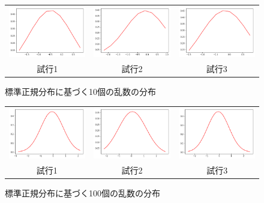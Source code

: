 \begin{figure}[h]
  \begin{center}
    \begin{tabular}{ccc}
      \includegraphics[width=0.32\hsize]{figure/10__1.png} &
      \includegraphics[width=0.32\hsize]{figure/10__2.png} &
      \includegraphics[width=0.32\hsize]{figure/10__3.png} \\
      試行1 & 試行2 &試行3
    \end{tabular}
    \caption{標準正規分布に基づく10個の乱数の分布}
    \label{figure1}
  \end{center}
\end{figure}
\begin{figure}[h]
  \begin{center}
    \begin{tabular}{ccc}
      \includegraphics[width=0.32\hsize]{figure/100__1.png} &
      \includegraphics[width=0.32\hsize]{figure/100__2.png} &
      \includegraphics[width=0.32\hsize]{figure/100__3.png} \\
      試行1 & 試行2 &試行3
    \end{tabular}
    \caption{標準正規分布に基づく100個の乱数の分布}
    \label{figure1}
  \end{center}
\end{figure}
